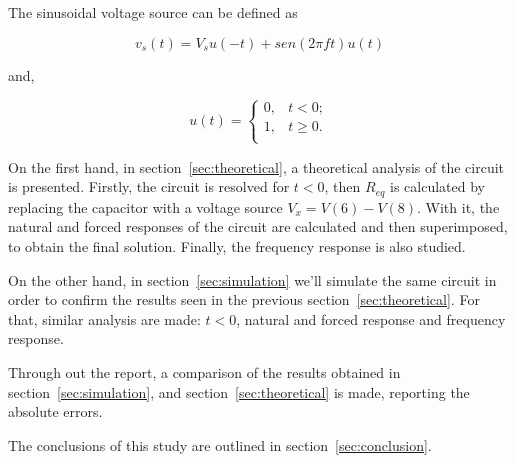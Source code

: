 \par The sinusoidal voltage source can be defined as 

\begin{equation}
  v_s(t) = V_{s}u(-t) + sen(2\pi ft)u(t) 
  \label{eq:vs}
\end{equation}

and,

\begin{equation}
u(t)= \begin{cases} 
	     0, & t<0; \\ 
	     1, & t \geq 0. \\
      \end{cases}
      \label{eq:teo}
\end{equation}

\par On the first hand, in section~\ref{sec:theoretical}, a theoretical analysis of the circuit is
presented. Firstly, the circuit is resolved for $t<0$, then $R_{eq}$ is calculated by replacing the capacitor with a voltage source $V_x=V(6)-V(8)$. With it, the natural and forced responses of the circuit are calculated and then superimposed, to obtain the final solution. Finally, the frequency response is also studied.

\par On the other hand, in section~\ref{sec:simulation} we'll simulate the same circuit in order to confirm the results seen in the previous section~\ref{sec:theoretical}. For that, similar analysis are made: $t<0$, natural and forced response and frequency response.

\par Through out the report, a comparison of the results obtained in section~\ref{sec:simulation}, and section~\ref{sec:theoretical} is made, reporting the absolute errors. 

\par  The conclusions of this study are outlined in section~\ref{sec:conclusion}.

\newpage
